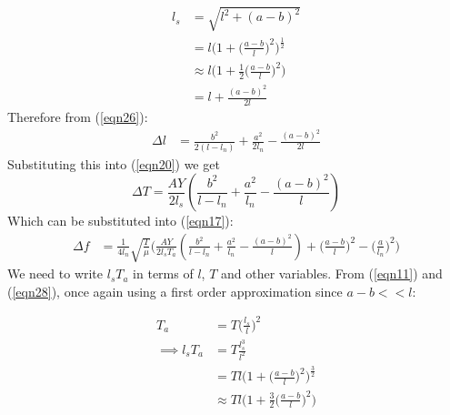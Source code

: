 \begin{align}
    l_s &= \sqrt{l^2 + (a-b)^2}\\
    &= l\bigg(1 + \bigg(\frac{a-b}{l}\bigg)^2\bigg)^\frac{1}{2} \label{eqn28}\\
    &\approx l\bigg(1 + \frac{1}{2}\bigg(\frac{a-b}{l}\bigg)^2\bigg)\\
    &= l + \frac{(a-b)^2}{2l}
\end{align}
Therefore from (\ref{eqn26}):
\begin{align}
    \Delta l &= \frac{b^2}{2(l-l_n)} + \frac{a^2}{2l_n} - \frac{(a-b)^2}{2l}
\end{align}
Substituting this into (\ref{eqn20}) we get
\begin{equation}
    \Delta T = \frac{AY}{2l_s} \left( \frac{b^2}{l-l_n} + \frac{a^2}{l_n} - \frac{(a-b)^2}{l} \right) \label{eqn32}
\end{equation}
Which can be substituted into (\ref{eqn17}):
\begin{align}
    \Delta f &= \frac{1}{4l_n} \sqrt{\frac{T}{\mu}} \bigg( \frac{AY}{2l_s T_a} \left( \frac{b^2}{l-l_n} + \frac{a^2}{l_n} - \frac{(a-b)^2}{l} \right) + \bigg(\frac{a-b}{l}\bigg)^2 - \bigg(\frac{a}{l_n} \bigg)^2 \bigg) \label{eqn33}
\end{align}
We need to write $l_s T_a$ in terms of $l$, $T$ and other variables. From (\ref{eqn11}) and (\ref{eqn28}), once again using a first order approximation since $a-b << l$:

\begin{align}
    T_a &= T\bigg(\frac{l_s}{l}\bigg)^2 \\
    \implies l_s T_a &= T \frac{l_s^3}{l^2} \\
    &= Tl \bigg(1 + \bigg(\frac{a-b}{l}\bigg)^2\bigg)^\frac{3}{2} \\
    &\approx Tl \bigg(1 + \frac{3}{2}\bigg(\frac{a-b}{l}\bigg)^2\bigg) \label{eqn37}
\end{align}